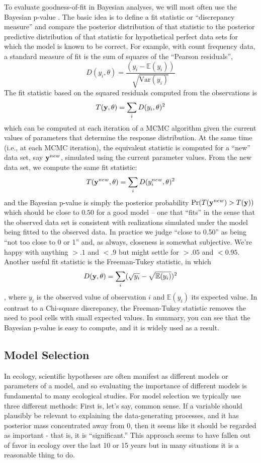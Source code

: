 To evaluate goodness-of-fit in Bayesian analyses, we will most often
use the Bayesian p-value \citep{gelman_etal:1996}.  The basic idea is to define
a fit statistic or ``discrepancy measure'' and compare the posterior distribution of that
statistic to the posterior predictive distribution of that statistic
for hypothetical perfect data sets for which the model is known to be correct. For
example, with count frequency data, a standard measure of fit is the
sum of squares of the ``Pearson residuals'',
\[
D(y_i,\theta) = \frac{(y_i - \mathbb{E}(y_i))}{\sqrt{\mbox{Var}( y_{i} )}}
\]
The fit statistic based on the squared residuals computed from the
observations is 
\[
T({\bf y}, \theta) = \sum_{i} D(y_{i},\theta)^{2}
\]
which can be computed at each iteration of a MCMC algorithm given the
current values of parameters that determine the
 response distribution.  At the same time (i.e., at each MCMC
 iteration),
the equivalent statistic is computed for a
``new'' data set, say ${\bf y}^{new}$, 
simulated using the current parameter values. From the new data set,
we compute the same fit statistic:
\[
T({\bf y}^{new}, \theta) = \sum_{i} D(y_{i}^{new},\theta)^{2}
\]
and 
the
Bayesian p-value is simply the posterior probability $\Pr(T({\bf
  y}^{new})  >  T({\bf y}))$
 which should be close to $0.50$ for a good model -- one that
 ``fits'' in the sense that the observed data set is
 consistent with realizations simulated under the model being fitted
 to the observed data. In practice
we judge ``close to 0.50'' as being ``not too close to 0 or 1'' and,
as always, closeness is somewhat subjective. We're happy with anything
$>.1$ and $<.9$ but might settle for $>.05$ and $<0.95$. 
Another useful fit statistic is the Freeman-Tukey
statistic, in which
\[
D({\bf y},\theta) = \sum_{i} ( \sqrt{y_{i}} - \sqrt{\mathbb{E}(y_{i})} )^2
\]
\citep{brooks_etal:2000}, where $y_{i}$ is the observed value of
observation $i$ and $\mathbb{E}(y_{i})$ its expected value. In contrast to a
Chi-square discrepancy, the Freeman-Tukey statistic removes the need
to pool cells with small expected values.
In summary, you can see that 
the Bayesian p-value is easy to compute,
and it is widely used as a result.


\subsection{Model Selection }

In ecology, scientific hypotheses are often manifest as different models or parameters
 of a model, and so
evaluating the importance of different models is fundamental 
to many ecological studies.
For model selection we typically use three different methods: First
is, let's say, common sense. If a variable should plausibly be
relevant to explaining the data-generating processes, and it has 
 posterior mass
concentrated away from 0, then it seems like it should be regarded as
important - that is, it is ``significant.''  This approach seems to
have fallen out of favor in ecology over the last 10 or
15 years but in many situations it is a reasonable thing to do.


